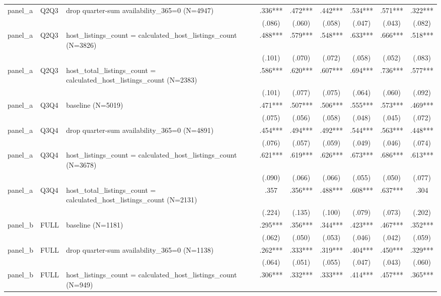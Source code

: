 \begin{tabular}{lllcccccc}
panel\_a & Q2Q3 & drop quarter-sum availability\_365=0 (N=4947) & .336*** & .472*** & .442*** & .534*** & .571*** & .322***
\\
 &  &  & (.086) & (.060) & (.058) & (.047) & (.043) & (.082)
\\
panel\_a & Q2Q3 & host\_listings\_count = calculated\_host\_listings\_count (N=3826) & .488*** & .579*** & .548*** & .633*** & .666*** & .518***
\\
 &  &  & (.101) & (.070) & (.072) & (.058) & (.052) & (.083)
\\
panel\_a & Q2Q3 & host\_total\_listings\_count = calculated\_host\_listings\_count (N=2383) & .586*** & .620*** & .607*** & .694*** & .736*** & .577***
\\
 &  &  & (.101) & (.077) & (.075) & (.064) & (.060) & (.092)
\\
panel\_a & Q3Q4 & baseline (N=5019) & .471*** & .507*** & .506*** & .555*** & .573*** & .469***
\\
 &  &  & (.075) & (.056) & (.058) & (.048) & (.045) & (.072)
\\
panel\_a & Q3Q4 & drop quarter-sum availability\_365=0 (N=4891) & .454*** & .494*** & .492*** & .544*** & .563*** & .448***
\\
 &  &  & (.076) & (.057) & (.059) & (.049) & (.046) & (.074)
\\
panel\_a & Q3Q4 & host\_listings\_count = calculated\_host\_listings\_count (N=3678) & .621*** & .619*** & .626*** & .673*** & .686*** & .613***
\\
 &  &  & (.090) & (.066) & (.066) & (.055) & (.050) & (.077)
\\
panel\_a & Q3Q4 & host\_total\_listings\_count = calculated\_host\_listings\_count (N=2131) & .357 & .356*** & .488*** & .608*** & .637*** & .304
\\
 &  &  & (.224) & (.135) & (.100) & (.079) & (.073) & (.202)
\\
panel\_b & FULL & baseline (N=1181) & .295*** & .356*** & .344*** & .423*** & .467*** & .352***
\\
 &  &  & (.062) & (.050) & (.053) & (.046) & (.042) & (.059)
\\
panel\_b & FULL & drop quarter-sum availability\_365=0 (N=1138) & .262*** & .333*** & .319*** & .404*** & .450*** & .329***
\\
 &  &  & (.064) & (.051) & (.055) & (.047) & (.043) & (.060)
\\
panel\_b & FULL & host\_listings\_count = calculated\_host\_listings\_count (N=949) & .306*** & .332*** & .333*** & .414*** & .457*** & .365***

\end{tabular}
